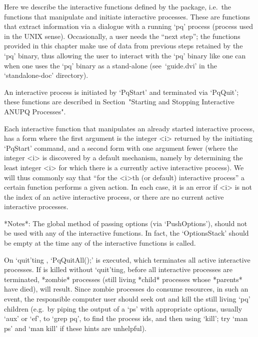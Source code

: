 

Here we describe  the  interactive  functions  defined  by  the  {\ANUPQ}
package, i.e.~the functions  that  manipulate  and  initiate  interactive
{\ANUPQ} processes. These are functions that extract  information  via  a
dialogue with a running `pq' process (process used in  the  UNIX  sense).
Occasionally, a user needs the ``next step''; the functions  provided  in
this chapter make use of data from previous steps retained  by  the  `pq'
binary, thus allowing the user to interact with the `pq' binary like  one
can when one uses the `pq' binary as a  stand-alone  (see~`guide.dvi'  in
the `standalone-doc' directory).

An  interactive  {\ANUPQ}  process  is  initiated  by   `PqStart'   and
terminated  via  `PqQuit';   these   functions   are   described   in
Section~"Starting and Stopping Interactive ANUPQ Processes".

Each interactive {\ANUPQ} function that manipulates  an  already  started
interactive {\ANUPQ} process, has a form where the first argument is  the
integer <i> returned by the initiating `PqStart' command,  and  a  second
form with one argument fewer (where the integer <i> is  discovered  by  a
default mechanism, namely by determining the least integer <i> for  which
there is a currently active interactive {\ANUPQ} process). We  will  thus
commonly say that ``for  the  <i>th  (or  default)  interactive  {\ANUPQ}
process'' a certain function performs a given action. In each case, it is
an error if <i> is not the index of an  active  interactive  process,  or
there are no current active interactive processes.

*Notes*: 
The global method of passing options (via `PushOptions'), should  not  be
used with any of the interactive functions. In fact,  the  `OptionsStack'
should be empty at the time any of the interactive functions is called.

On `quit'ting {\GAP}, `PqQuitAll();' is executed,  which  terminates  all
active interactive  {\ANUPQ}  processes.  If  {\GAP}  is  killed  without
`quit'ting, before all interactive  {\ANUPQ}  processes  are  terminated,
*zombie* processes (still living *child* processes whose  *parents*  have
died), will result. Since zombie processes do consume resources, in  such
an event, the responsible computer user should  seek  out  and  kill  the
still living `pq' children (e.g.~by piping the  output  of  a  `ps'  with
appropriate options, usually `aux' or `ef', to `grep  pq',  to  find  the
process ids, and then using `kill'; try `man ps' and `man kill' if  these
hints are unhelpful).


